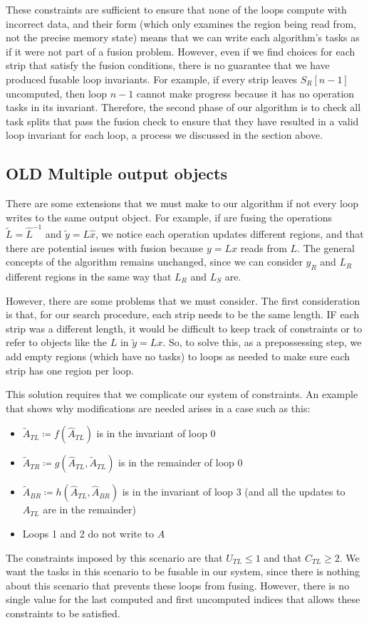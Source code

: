 \documentclass[12pt,letterpaper]{article}
\begin{document}
These constraints are sufficient to ensure that none of the loops compute with incorrect data, and their form (which only examines the region being read from, not the precise memory state) means that we can write each algorithm's tasks as if it were not part of a fusion problem.
However, even if we find choices for each strip that satisfy the fusion conditions, there is no guarantee that we have produced fusable loop invariants.
For example, if every strip leaves $S_R[n - 1]$ uncomputed, then loop $n - 1$ cannot make progress because it has no operation tasks in its invariant.
Therefore, the second phase of our algorithm is to check all task splits that pass the fusion check to ensure that they have resulted in a valid loop invariant for each loop, a process we discussed in the section above.
\subsection{OLD Multiple output objects}
There are some extensions that we must make to our algorithm if not every loop writes to the same output object.
For example, if are fusing the operations $\widetilde{L} = \hat{L}^{-1}$ and $\widetilde{y} = L\hat{x}$, we notice each operation updates different regions, and that there are potential issues with fusion because $y = Lx$ reads from $L$.
The general concepts of the algorithm remains unchanged, since we can consider $y_R$ and $L_R$ different regions in the same way that $L_R$ and $L_S$ are.

However, there are some problems that we must consider.
The first consideration is that, for our search procedure, each strip needs to be the same length.
IF each strip was a different length, it would be difficult to keep track of constraints or to refer to objects like the $L$ in $\widetilde{y} = Lx$.
So, to solve this, as a prepossessing step, we add empty regions (which have no tasks) to loops as needed to make sure each strip has one region per loop.

This solution requires that we complicate our system of constraints.
An example that shows why modifications are needed arises in a case such as this:
\begin{itemize}
\item $\widetilde{A}_{TL} \coloneqq f(\hat{A}_{TL})$ is in the invariant of loop 0
\item $\widetilde{A}_{TR} \coloneqq g(\hat{A}_{TL}, \widetilde{A}_{TL})$ is in the remainder of loop 0
\item $\widetilde{A}_{BR} \coloneqq h(\hat{A}_{TL}, \hat{A}_{BR})$ is in the invariant of loop 3 (and all the updates to $A_{TL}$ are in the remainder)
\item Loops 1 and 2 do not write to $A$
\end{itemize}
The constraints imposed by this scenario are that $U_{TL} \leq 1$ and that $C_{TL} \geq 2$.
We want the tasks in this scenario to be fusable in our system, since there is nothing about this scenario that prevents these loops from fusing.
However, there is no single value for the last computed and first uncomputed indices that allows these constraints to be satisfied.
\end{document}
